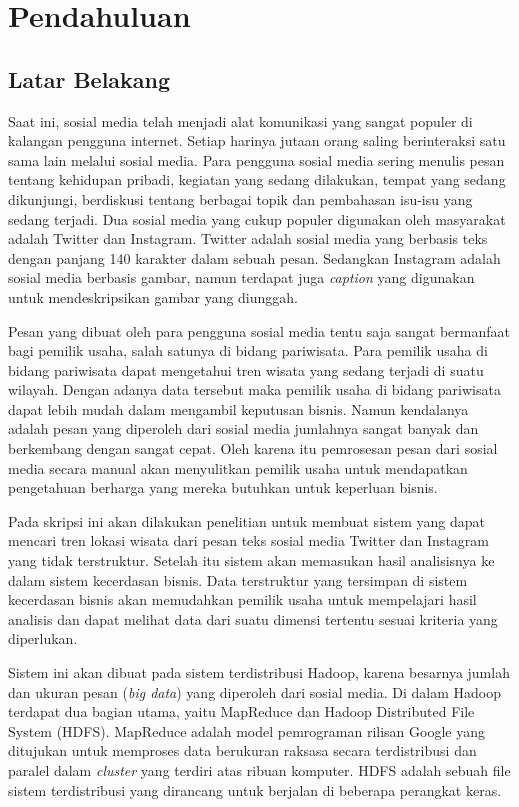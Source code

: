 \chapter{Pendahuluan}
\label{chap:pendahuluan}

\section{Latar Belakang}
\label{sec:latar_belakang}
Saat ini, sosial media telah menjadi alat komunikasi yang sangat populer di kalangan pengguna internet. Setiap harinya jutaan orang saling berinteraksi satu sama lain melalui sosial media. Para pengguna sosial media sering menulis pesan tentang kehidupan pribadi, kegiatan yang sedang dilakukan, tempat yang sedang dikunjungi, berdiskusi tentang berbagai topik dan pembahasan isu-isu yang sedang terjadi. Dua sosial media yang cukup populer digunakan oleh masyarakat adalah Twitter dan Instagram. Twitter adalah sosial media yang berbasis teks dengan panjang 140 karakter dalam sebuah pesan. Sedangkan Instagram adalah sosial media berbasis gambar, namun terdapat juga \textit{caption} yang digunakan untuk mendeskripsikan gambar yang diunggah.

Pesan yang dibuat oleh para pengguna sosial media tentu saja sangat bermanfaat bagi pemilik usaha, salah satunya di bidang pariwisata. Para pemilik usaha di bidang pariwisata dapat mengetahui tren wisata yang sedang terjadi di suatu wilayah. Dengan adanya data tersebut maka pemilik usaha di bidang pariwisata dapat lebih mudah dalam mengambil keputusan bisnis. Namun kendalanya adalah pesan yang diperoleh dari sosial media jumlahnya sangat banyak dan berkembang dengan sangat cepat. Oleh karena itu pemrosesan pesan dari sosial media secara manual akan menyulitkan pemilik usaha untuk mendapatkan pengetahuan berharga yang mereka butuhkan untuk keperluan bisnis.

Pada skripsi ini akan dilakukan penelitian untuk membuat sistem yang dapat mencari tren lokasi wisata dari pesan teks sosial media Twitter dan Instagram yang tidak terstruktur. Setelah itu sistem akan memasukan hasil analisisnya ke dalam sistem kecerdasan bisnis. Data terstruktur yang tersimpan di sistem kecerdasan bisnis akan memudahkan pemilik usaha untuk mempelajari hasil analisis dan dapat melihat data dari suatu dimensi tertentu sesuai kriteria yang diperlukan. 

Sistem ini akan dibuat pada sistem terdistribusi Hadoop, karena besarnya jumlah dan ukuran pesan (\textit{big data}) yang diperoleh dari sosial media. Di dalam Hadoop terdapat dua bagian utama, yaitu MapReduce dan Hadoop Distributed File System (HDFS). MapReduce adalah model pemrograman rilisan Google yang ditujukan untuk memproses data berukuran raksasa secara terdistribusi dan paralel dalam \textit{cluster} yang terdiri atas ribuan komputer. HDFS adalah sebuah file sistem terdistribusi yang dirancang untuk berjalan di beberapa perangkat keras.

